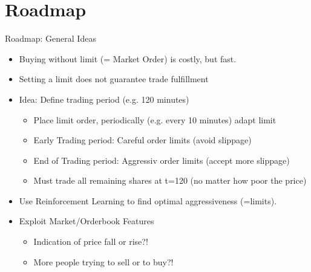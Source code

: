 \documentclass[10pt]{beamer}
\begin{document}
\section{Roadmap}
\begin{frame}[fragile]{Roadmap: General Ideas}

\begin{itemize}
\item Buying without limit (= Market Order) is costly, but fast.
\item Setting a limit does not guarantee trade fulfillment
\item Idea: Define trading period (e.g. 120 minutes)

\begin{itemize}
\item Place limit order, periodically (e.g. every 10 minutes) adapt limit
\item Early Trading period: Careful order limits (avoid slippage)
\item End of Trading period: Aggressiv order limits (accept more slippage)
\item Must trade all remaining shares at t=120 (no matter how poor the price)
\end{itemize}

\item Use Reinforcement Learning to find optimal aggressiveness (=limits).
\item Exploit Market/Orderbook Features
\begin{itemize}
\item Indication of price fall or rise?!
\item More people trying to sell or to buy?!
\end{itemize}

\end{itemize}

\end{frame}
\end{document}
